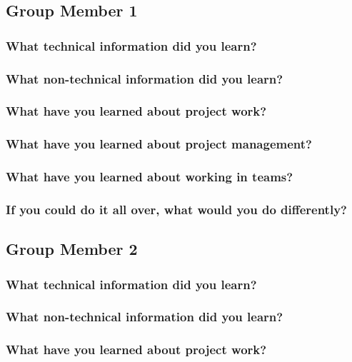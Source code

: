 \clearpage

\subsection{Group Member 1}

\subsubsection{What technical information did you learn?}
\subsubsection{What non-technical information did you learn?}
\subsubsection{What have you learned about project work?}
\subsubsection{What have you learned about project management?}
\subsubsection{What have you learned about working in teams?}
\subsubsection{If you could do it all over, what would you do differently?}

\subsection{Group Member 2}

\subsubsection{What technical information did you learn?}
\subsubsection{What non-technical information did you learn?}
\subsubsection{What have you learned about project work?}
